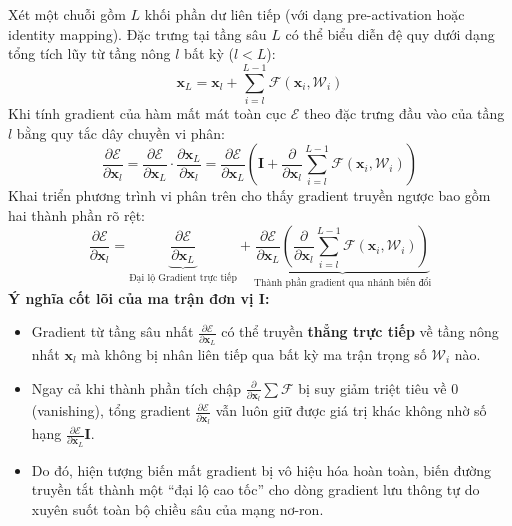 \documentclass[12pt,a4paper]{report}
\begin{document}
Xét một chuỗi gồm $L$ khối phần dư liên tiếp (với dạng pre-activation hoặc identity mapping). Đặc trưng tại tầng sâu $L$ có thể biểu diễn đệ quy dưới dạng tổng tích lũy từ tầng nông $l$ bất kỳ ($l < L$):
\begin{equation}
    \mathbf{x}_L = \mathbf{x}_l + \sum_{i=l}^{L-1} \mathcal{F}(\mathbf{x}_i, \mathcal{W}_i)
\end{equation}
Khi tính gradient của hàm mất mát toàn cục $\mathcal{E}$ theo đặc trưng đầu vào của tầng $l$ bằng quy tắc dây chuyền vi phân:
\begin{equation}
    \frac{\partial \mathcal{E}}{\partial \mathbf{x}_l} = \frac{\partial \mathcal{E}}{\partial \mathbf{x}_L} \cdot \frac{\partial \mathbf{x}_L}{\partial \mathbf{x}_l} = \frac{\partial \mathcal{E}}{\partial \mathbf{x}_L} \left( \mathbf{I} + \frac{\partial}{\partial \mathbf{x}_l} \sum_{i=l}^{L-1} \mathcal{F}(\mathbf{x}_i, \mathcal{W}_i) \right)
\end{equation}
Khai triển phương trình vi phân trên cho thấy gradient truyền ngược bao gồm hai thành phần rõ rệt:
\begin{equation}
    \frac{\partial \mathcal{E}}{\partial \mathbf{x}_l} = \underbrace{\frac{\partial \mathcal{E}}{\partial \mathbf{x}_L}}_{\text{Đại lộ Gradient trực tiếp}} + \underbrace{\frac{\partial \mathcal{E}}{\partial \mathbf{x}_L} \left(\frac{\partial}{\partial \mathbf{x}_l} \sum_{i=l}^{L-1} \mathcal{F}(\mathbf{x}_i, \mathcal{W}_i)\right)}_{\text{Thành phần gradient qua nhánh biến đổi}}
\end{equation}
\textbf{Ý nghĩa cốt lõi của ma trận đơn vị $\mathbf{I}$:}
\begin{itemize}[leftmargin=*]
    \item Gradient từ tầng sâu nhất $\frac{\partial \mathcal{E}}{\partial \mathbf{x}_L}$ có thể truyền \textbf{thẳng trực tiếp} về tầng nông nhất $\mathbf{x}_l$ mà không bị nhân liên tiếp qua bất kỳ ma trận trọng số $\mathcal{W}_i$ nào.
    \item Ngay cả khi thành phần tích chập $\frac{\partial}{\partial \mathbf{x}_l} \sum \mathcal{F}$ bị suy giảm triệt tiêu về 0 (vanishing), tổng gradient $\frac{\partial \mathcal{E}}{\partial \mathbf{x}_l}$ vẫn luôn giữ được giá trị khác không nhờ số hạng $\frac{\partial \mathcal{E}}{\partial \mathbf{x}_L} \mathbf{I}$.
    \item Do đó, hiện tượng biến mất gradient bị vô hiệu hóa hoàn toàn, biến đường truyền tắt thành một ``đại lộ cao tốc'' cho dòng gradient lưu thông tự do xuyên suốt toàn bộ chiều sâu của mạng nơ-ron.
\end{itemize}
\end{document}
